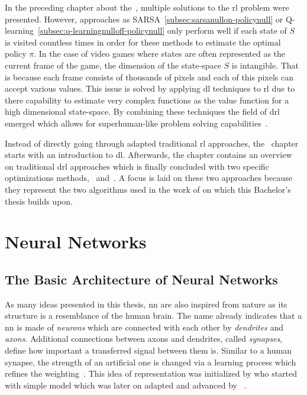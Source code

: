\documentclass[draft,final]{vutinfth} %
\begin{document}
    In the preceding chapter about the~, multiple solutions to the \gls{rl} problem were presented.
    However, approaches as SARSA~\eqref{subsec:sarsanullon-policynull} or Q-learning~\eqref{subsec:q-learningnulloff-policynull} only perform well if each state of $\mathit{S}$ is visited countless times in order for these methods to estimate the optimal policy $\pi$.
    In the case of video games where states are often represented as the current frame of the game, the dimension of the state-space $\mathit{S}$ is intangible.
    That is because each frame consists of thousands of pixels and each of this pixels can accept various values.
    This issue is solved by applying \gls{dl} techniques to \gls{rl} due to there capability to estimate very complex functions as the value function for a high dimensional state-space.
    By combining these techniques the field of \gls{drl} emerged which allows for superhuman-like problem solving capabilities~\citep{francois-lavet_introduction_2018}.

    Instead of directly going through adapted traditional \gls{rl} approaches, the~ chapter starts with an introduction to \gls{dl}.
    Afterwards, the chapter contains an overview on traditional \gls{drl} approaches which is finally concluded with two specific optimizations methods,~ and~.
    A focus is laid on these two approaches because they represent the two algorithms used in the work of \citeauthor{burda_large-scale_2018-1} on which this Bachelor's thesis builds upon.


    \section{Neural Networks}

    \subsection{The Basic Architecture of Neural Networks}


    As many ideas presented in this thesis, \gls{nn} are also inspired from nature as its structure is a resemblance of the human brain.
    The name already indicates that a \gls{nn} is made of \textit{neurons} which are connected with each other by \textit{dendrites} and \textit{axons}.
    Additional connections between axons and dendrites, called \textit{synapses}, define how important a transferred signal between them is.
    Similar to a human synapse, the strength of an artificial one is changed via a learning process which refines the weighting~\citep{aggarwal_neural_2018}.
    This idea of representation was initialized by \citeauthor{mcculloch_logical_1943} who started with simple model which was later on adapted and advanced by \citeauthor{rosenblatt_perceptron_1957}~\citep{goodfellow_deep_2016}.
\end{document}

